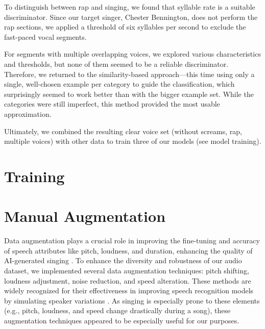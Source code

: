 \documentclass[a4paper]{article}
\begin{document}
To distinguish between rap and singing, we found that syllable rate is a suitable discriminator. Since our target singer, Chester Bennington, does not perform the rap sections, we applied a threshold of six syllables per second to exclude the fast-paced vocal segments.

For segments with multiple overlapping voices, we explored various characteristics and thresholds, but none of them seemed to be a reliable discriminator. Therefore, we returned to the similarity-based approach—this time using only a single, well-chosen example per category to guide the classification, which surprisingly seemed to work better than with the bigger example set. While the categories were still imperfect, this method provided the most usable approximation.

Ultimately, we combined the resulting clear voice set (without screams, rap, multiple voices) with other data to train three of our models (see model training).






\section*{Training}

\section*{Manual Augmentation}

Data augmentation plays a crucial role in improving the fine-tuning and accuracy of speech attributes like pitch, loudness, and duration, enhancing the quality of AI-generated singing \cite{Morrison2024}.
To enhance the diversity and robustness of our audio dataset, we implemented several data augmentation techniques: pitch shifting, loudness adjustment, noise reduction, and speed alteration. These methods are widely recognized for their effectiveness in improving speech recognition models by simulating speaker variations \cite{Morrison2024}. As singing is especially prone to these elements (e.g., pitch, loudness, and speed change drastically during a song), these augmentation techniques appeared to be especially useful for our purposes.
\end{document}
